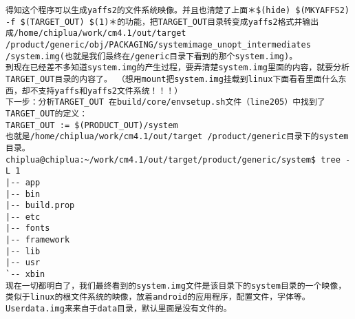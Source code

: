 \documentclass[12pt,a4paper]{article}
\begin{document}
\begin{verbatim}
得知这个程序可以生成yaffs2的文件系统映像。并且也清楚了上面＊$(hide) $(MKYAFFS2) -f $(TARGET_OUT) $(1)＊的功能，把TARGET_OUT目录转变成yaffs2格式并输出成/home/chiplua/work/cm4.1/out/target /product/generic/obj/PACKAGING/systemimage_unopt_intermediates /system.img(也就是我们最终在/generic目录下看到的那个system.img)。
到现在已经差不多知道system.img的产生过程，要弄清楚system.img里面的内容，就要分析TARGET_OUT目录的内容了。 （想用mount把system.img挂载到linux下面看看里面什么东西，却不支持yaffs和yaffs2文件系统！！！）
下一步：分析TARGET_OUT 在build/core/envsetup.sh文件（line205）中找到了TARGET_OUT的定义：
TARGET_OUT := $(PRODUCT_OUT)/system
也就是/home/chiplua/work/cm4.1/out/target /product/generic目录下的system目录。
chiplua@chiplua:~/work/cm4.1/out/target/product/generic/system$ tree -L 1
|-- app
|-- bin
|-- build.prop
|-- etc
|-- fonts
|-- framework
|-- lib
|-- usr
`-- xbin
现在一切都明白了，我们最终看到的system.img文件是该目录下的system目录的一个映像，类似于linux的根文件系统的映像，放着android的应用程序，配置文件，字体等。
Userdata.img来来自于data目录，默认里面是没有文件的。
\end{verbatim}
\label{6}
\end{document}
